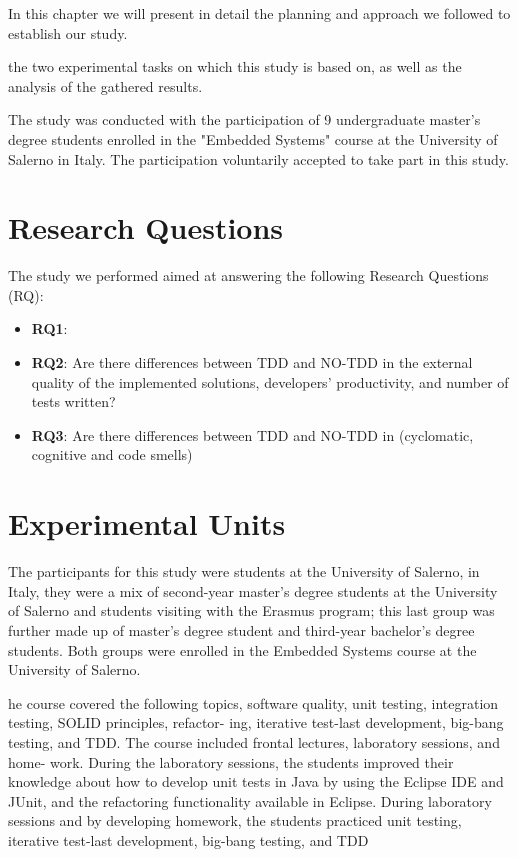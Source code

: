 In this chapter we will present in detail the planning and approach we followed to establish our study.

the two experimental tasks on which this study is based on, as well as the analysis of the gathered results.

The study was conducted with the participation of 9 undergraduate master's degree students enrolled in the "Embedded Systems" course at the University of Salerno in Italy. The participation voluntarily accepted to take part in this study.


\section{Research Questions}
The study we performed aimed at answering the following Research Questions (RQ):
\begin{itemize}
    \item \textbf{RQ1}:
    \item \textbf{RQ2}: Are there differences between TDD and NO-TDD in the external quality of the implemented solutions, developers’ productivity, and number of tests written?
    \item \textbf{RQ3}: Are there differences between TDD and NO-TDD in (cyclomatic, cognitive and code smells)
\end{itemize}




\section{Experimental Units}
The participants for this study were students at the University of Salerno, in Italy, they were a mix of second-year master's degree students at the University of Salerno and students visiting with the Erasmus program; this last group was further made up of master's degree student and third-year bachelor's degree students. Both groups were enrolled in the Embedded Systems course at the University of Salerno.

he course covered the following topics, software
quality, unit testing, integration testing, SOLID principles, refactor-
ing, iterative test-last development, big-bang testing, and TDD. The
course included frontal lectures, laboratory sessions, and home-
work. During the laboratory sessions, the students improved their
knowledge about how to develop unit tests in Java by using the
Eclipse IDE and JUnit, and the refactoring functionality available in
Eclipse. During laboratory sessions and by developing homework,
the students practiced unit testing, iterative test-last development,
big-bang testing, and TDD

